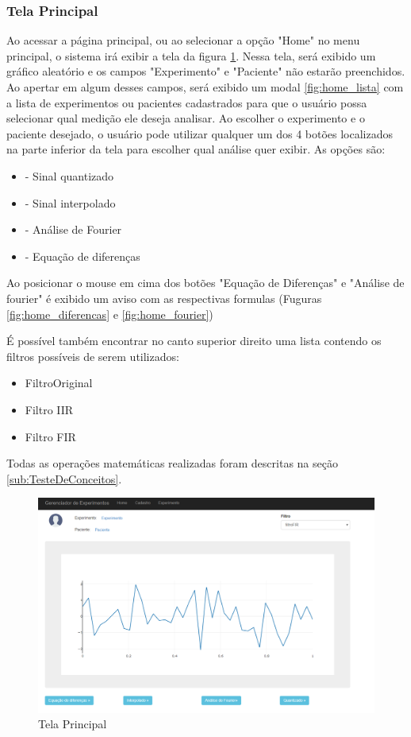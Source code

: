 \subsubsection{Tela Principal} \label{sec:tela_principal}

Ao acessar a página principal, ou ao selecionar a opção "Home" no menu principal, o sistema irá exibir a tela da figura \ref{fig:home}. Nessa tela, será exibido um gráfico aleatório e os campos "Experimento" e "Paciente" não estarão preenchidos. Ao apertar em algum desses campos, será exibido um modal \ref{fig:home_lista} com a lista de experimentos ou pacientes cadastrados para que o usuário possa selecionar qual medição ele deseja analisar. Ao escolher o experimento e o paciente desejado, o usuário pode utilizar qualquer um dos 4 botões localizados na parte inferior da tela para escolher qual análise quer exibir. As opções são:

\begin{itemize}
	\item - Sinal quantizado
	\item - Sinal interpolado
	\item - Análise de Fourier
	\item - Equação de diferenças
\end{itemize}

Ao posicionar o mouse em cima dos botões "Equação de Diferenças" e "Análise de fourier" é exibido um aviso com as respectivas formulas (Fuguras \ref{fig:home_diferencas} e \ref{fig:home_fourier}) 

É possível também encontrar no canto superior direito uma lista contendo os filtros possíveis de serem utilizados:

\begin{itemize}
	\item FiltroOriginal
	\item Filtro IIR
	\item Filtro FIR
\end{itemize}

Todas as operações matemáticas realizadas foram descritas na seção \ref{sub:TesteDeConceitos}.


  \begin{figure}[h!]
	\begin{center}
		\includegraphics[width=0.8\linewidth]{images/home.png}
		\caption{Tela Principal}
		\label{fig:home}
	\end{center}
\end{figure}

